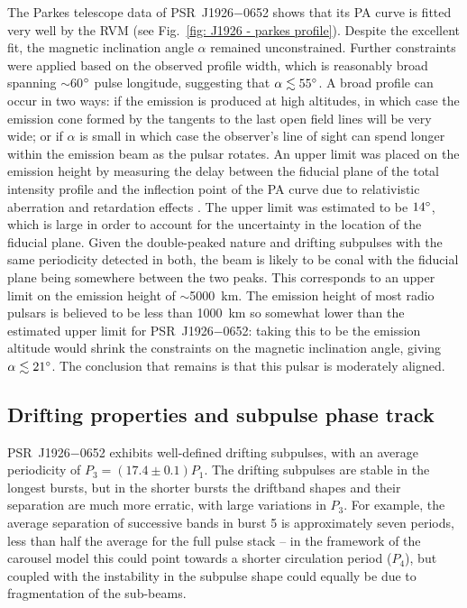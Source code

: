 The Parkes telescope data of PSR~J1926$-$0652 shows that its PA curve is fitted very well by the RVM (see Fig.~\ref{fig: J1926 - parkes profile}). Despite the excellent fit, the magnetic inclination angle $\alpha$ remained unconstrained. Further constraints were applied based on the observed profile width, which is reasonably broad spanning $\sim$60$^\circ$ pulse longitude, suggesting that $\alpha \lesssim 55^\circ$. A broad profile can occur in two ways: if the emission is produced at high altitudes, in which case the emission cone formed by the tangents to the last open field lines will be very wide; or if $\alpha$ is small in which case the observer's line of sight can spend longer within the emission beam as the pulsar rotates. An upper limit was placed on the emission height by measuring the delay between the fiducial plane of the total intensity profile and the inflection point of the PA curve due to relativistic aberration and retardation effects \citep{BCWx1991}. The upper limit was estimated to be $14^\circ$, which is large in order to account for the uncertainty in the location of the fiducial plane. Given the double-peaked nature and drifting subpulses with the same periodicity detected in both, the beam is likely to be conal \citep{Rxxx1983a} with the fiducial plane being somewhere between the two peaks. This corresponds to an upper limit on the emission height of $\sim$5000~km. The emission height of most radio pulsars is believed to be less than 1000~km \citep[e.g.][]{KJxx2007,JKxx2019,JSKx2020} so somewhat lower than the estimated upper limit for PSR~J1926$-$0652: taking this to be the emission altitude would shrink the constraints on the magnetic inclination angle, giving $\alpha \lesssim 21^\circ$. The conclusion that remains is that this pulsar is moderately aligned.






\subsection{Drifting properties and subpulse phase track}
\label{sec: J1926 - discuss - phase track}


PSR~J1926$-$0652 exhibits well-defined drifting subpulses, with an average periodicity of $P_3 = (17.4 \pm 0.1) P_1$. The drifting subpulses are stable in the longest bursts, but in the shorter bursts the driftband shapes and their separation are much more erratic, with large variations in $P_3$. For example, the average separation of successive bands in burst 5 is approximately seven periods, less than half the average for the full pulse stack -- in the framework of the carousel model this could point towards a shorter circulation period ($P_4$), but coupled with the instability in the subpulse shape could equally be due to fragmentation of the sub-beams.

